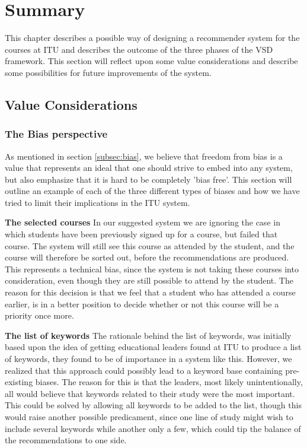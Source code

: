 
\section{Summary}
This chapter describes a possible way of designing a recommender system for the courses at ITU and describes the outcome of the three phases of the VSD framework.\newline
This section will reflect upon some value considerations and describe some possibilities for future improvements of the system. 

\subsection{Value Considerations} %
\label{sub:value_considerations}
\subsubsection{The Bias perspective}
\label{subsubsec:biasperspective}
As mentioned in section \ref{subsec:bias}, we believe that freedom from bias is a value that represents an ideal that one should strive to embed into any system, but also emphasize that it is hard to be completely 'bias free'. This section will outline an example of each of the three different types of biases and how we have tried to limit their implications in the ITU system.\newline

\textbf{The selected courses}\newline
In our suggested system we are ignoring the case in which students have been previously signed up for a course, but failed that course. The system will still see this course as attended by the student, and the course will therefore be sorted out, before the recommendations are produced.\newline
This represents a technical bias, since the system is not taking these courses into consideration, even though they are still possible to attend by the student. The reason for this decision is that we feel that a student who has attended a course earlier, is in a better position to decide whether or not this course will be a priority once more.\newline

\textbf{The list of keywords}\newline
The rationale behind the list of keywords, was initially based upon the idea of getting educational leaders found at ITU to produce a list of keywords, they found to be of importance in a system like this. However, we realized that this approach could possibly lead to a keyword base containing pre-existing biases. The reason for this is that the leaders, most likely unintentionally, all would believe that keywords related to their study were the most important.\newline
This could be solved by allowing all keywords to be added to the list, though this would raise another possible predicament, since one line of study might wish to include several keywords while another only a few, which could tip the balance of the recommendations to one side.

